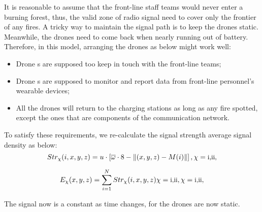 \documentclass[13pt]{ctexart} %
\begin{document}
It is reasonable to assume that the front-line staff teams would never enter a burning forest, thus, the valid zone of radio signal need to cover only the frontier of any fires. A tricky way to maintain the signal path is to keep the drones static. Meanwhile, the drones need to come back when nearly running out of battery. Therefore, in this model, arranging the drones as below might work well:
\begin{itemize}
    \item Drone \uppercase\expandafter{}s are supposed too keep in touch with the front-line teams;
    \item Drone \uppercase\expandafter{}s are supposed to monitor and report data from front-line personnel's wearable devices;
    \item All the drones will return to the charging stations as long as any fire spotted, except the ones that are components of the communication network.
\end{itemize}

To satisfy these requirements, we re-calculate the signal strength average signal density as below:
\begin{equation}
    Str_{\chi}(i,x,y,z)
    =u\cdot\left[
        \overline{\omega}\cdot 8
        -\lVert
        (x,y,z)-M(i)
        \rVert
        \right],
    \chi=\text{\small\uppercase\expandafter{\romannumeral1}}\text{\small ,}
    \text{\small\uppercase\expandafter{\romannumeral2}}\text{\small ,}
\end{equation}

\begin{equation}
    E_{\chi}(x,y,z)
    =\sum_{i=1}^{N}Str_{\chi}(i,x,y,z)
    \chi=\text{\small\uppercase\expandafter{\romannumeral1}}\text{\small ,}
    \text{\small\uppercase\expandafter{\romannumeral2}},
    \chi=\text{\small\uppercase\expandafter{\romannumeral1}}\text{\small ,}
    \text{\small\uppercase\expandafter{\romannumeral2}},
\end{equation}

The signal now is a constant as time changes, for the drones are now static.
\end{document}
